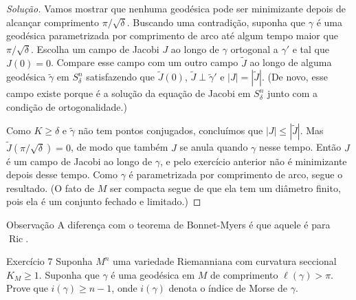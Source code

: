 \begin{proof}[Solução]\leavevmode
	Vamos mostrar que nenhuma geodésica pode ser minimizante depois de alcançar comprimento \(\pi/\sqrt{\delta}\). Buscando uma contradição, suponha que \(\gamma\) é uma geodésica parametrizada por comprimento de arco até algum tempo maior que \(\pi/\sqrt{\delta}\). Escolha um campo de Jacobi \(J\) ao longo de \(\gamma\) ortogonal a  \(\gamma'\) e tal que \(J(0)=0\). Compare esse campo com um outro campo \(\tilde{J}\) ao longo de alguma geodésica \(\tilde{\gamma}\) em \(S^n_\delta\) satisfazendo que \(\tilde{J}(0)\), \(\tilde{J} \perp \tilde{\gamma}'\) e \(|J|=|\tilde{J}|\). (De novo, esse campo existe porque é a solução da equação de Jacobi em \(S^n_\delta\) junto com a condição de ortogonalidade.)

Como \(K \geq  \delta\) e \(\tilde{\gamma}\) não tem pontos conjugados, concluímos que \(|J|\leq |\tilde{J}|\). Mas \(\tilde{J}(\pi/\sqrt{\delta})=0\), de modo que também  \(J\) se anula quando \(\gamma\) nesse tempo. Então \(J\) é um campo de Jacobi ao longo de \(\gamma\), e pelo exercício anterior não é minimizante depois desse tempo. Como \(\gamma\) é parametrizada por comprimento de arco, segue o resultado. (O fato de \(M\) ser compacta segue de que ela tem um diâmetro finito, pois ela é um conjunto fechado e limitado.)
\end{proof}

\begin{thing7}{Observação}\leavevmode
A diferença com o teorema de Bonnet-Myers é que aquele é para \(\operatorname{Ric}\).
\end{thing7}

\begin{thing6}{Exercício 7}\label{exer:7}\leavevmode
Suponha \(M^n\) uma variedade Riemanniana com curvatura seccional \(K_M \geq 1\). Suponha que \(\gamma\) é uma geodésica em \(M\) de comprimento \(\ell(\gamma)>\pi\). Prove que \(i(\gamma)\geq n-1\), onde  \(i(\gamma)\) denota o índice de Morse de  \(\gamma\).
\end{thing6}

